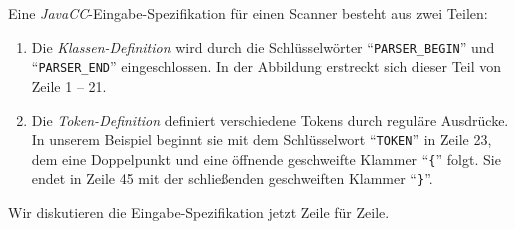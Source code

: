 Eine \textsl{JavaCC}-Eingabe-Spezifikation f\"ur einen Scanner besteht aus zwei Teilen:
\begin{enumerate}
\item Die \emph{Klassen-Definition} wird durch die Schl\"usselw\"orter
      ``\texttt{PARSER\_BEGIN}'' und ``\texttt{PARSER\_END}''
      eingeschlossen.  In der Abbildung erstreckt sich dieser Teil
      von Zeile 1 -- 21.
\item Die \textsl{Token-\/Definition} definiert verschiedene Tokens durch
      regul\"are Ausdr\"ucke.
      In unserem Beispiel beginnt sie mit dem Schl\"usselwort ``\texttt{TOKEN}''
      in Zeile 23, dem eine Doppelpunkt und eine \"offnende geschweifte Klammer
      ``\texttt{\{}'' folgt.   Sie endet in Zeile 45 mit der schlie{\ss}enden geschweiften
      Klammer ``\texttt{\}}''.
\end{enumerate}
Wir diskutieren die Eingabe-Spezifikation jetzt Zeile f\"ur Zeile.
